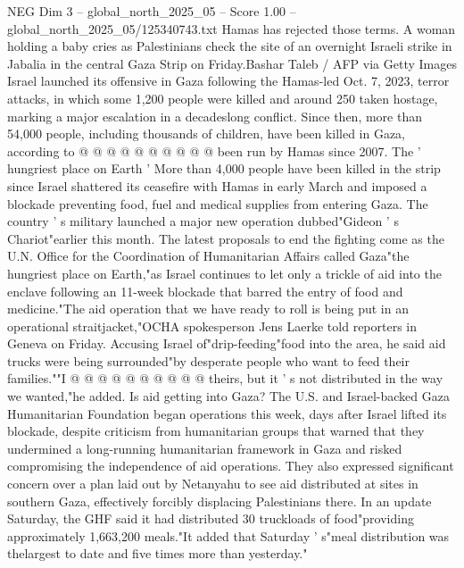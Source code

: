 \begin{textsample}{NEG Dim 3 – global\_north\_2025\_05 – Score 1.00 – global\_north\_2025\_05/125340743.txt}
Hamas has rejected those terms.
A woman holding a baby cries as Palestinians check the site of an overnight Israeli strike in Jabalia in the central Gaza Strip on Friday.Bashar Taleb / AFP via Getty Images Israel launched its offensive in Gaza following the Hamas-led Oct. 7, 2023, terror attacks, in which some 1,200 people were killed and around 250 taken hostage, marking a major escalation in a decadeslong conflict.
Since then, more than 54,000 people, including thousands of children, have been killed in Gaza, according to @ @ @ @ @ @ @ @ @ @ been run by Hamas since 2007.
The ' hungriest place on Earth ' More than 4,000 people have been killed in the strip since Israel shattered its ceasefire with Hamas in early March and imposed a blockade preventing food, fuel and medical supplies from entering Gaza.
The country ' s military launched a major new operation dubbed"Gideon ' s Chariot"earlier this month.
The latest proposals to end the fighting come as the U.N.
Office for the Coordination of Humanitarian Affairs called Gaza"the hungriest place on Earth,"as Israel continues to let only a trickle of aid into the enclave following an 11-week blockade that barred the entry of food and medicine."The aid operation that we have ready to roll is being put in an operational straitjacket,"OCHA spokesperson Jens Laerke told reporters in Geneva on Friday.
Accusing Israel of"drip-feeding"food into the area, he said aid trucks were being surrounded"by desperate people who want to feed their families.""I @ @ @ @ @ @ @ @ @ @ theirs, but it ' s not distributed in the way we wanted,"he added.
Is aid getting into Gaza?
The U.S. and Israel-backed Gaza Humanitarian Foundation began operations this week, days after Israel lifted its blockade, despite criticism from humanitarian groups that warned that they undermined a long-running humanitarian framework in Gaza and risked compromising the independence of aid operations.
They also expressed significant concern over a plan laid out by Netanyahu to see aid distributed at sites in southern Gaza, effectively forcibly displacing Palestinians there.
In an update Saturday, the GHF said it had distributed 30 truckloads of food"providing approximately 1,663,200 meals."It added that Saturday ' s"meal distribution was thelargest to date and five times more than yesterday."

\end{textsample}
